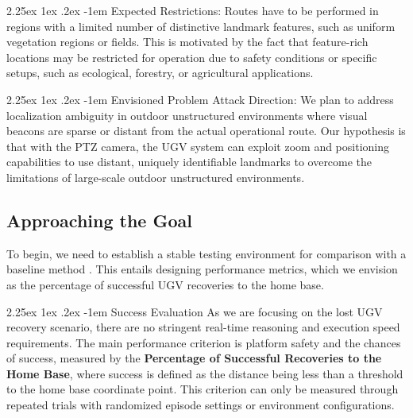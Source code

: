 \documentclass[runningheads]{llncs}
\makeatletter
\renewcommand\paragraph{\@startsection{paragraph}{4}{\z@}%
                                    {2.25ex \@plus1ex \@minus.2ex}%
                                    {-1em}%
                                    {\normalfont\normalsize\bfseries}}
\makeatother
\begin{document}
\paragraph{Expected Restrictions}:
Routes have to be performed in regions with a limited number of distinctive landmark features, such as uniform vegetation regions or fields. This is motivated by the fact that feature-rich locations may be restricted for operation due to safety conditions or specific setups, such as ecological, forestry, or agricultural applications.

\paragraph{Envisioned Problem Attack Direction}:
We plan to address localization ambiguity in outdoor unstructured environments where visual beacons are sparse or distant from the actual operational route. Our hypothesis is that with the PTZ camera, the UGV system can exploit zoom and positioning capabilities to use distant, uniquely identifiable landmarks to overcome the limitations of large-scale outdoor unstructured environments.

\subsection{Approaching the Goal}

To begin, we need to establish a stable testing environment for comparison with a baseline method \cite{VisualTeachAndRepeat}. This entails designing performance metrics, which we envision as the percentage of successful UGV recoveries to the home base.

\paragraph{Success Evaluation}
As we are focusing on the lost UGV recovery scenario, there are no stringent real-time reasoning and execution speed requirements. The main performance criterion is platform safety and the chances of success, measured by the \textbf{Percentage of Successful Recoveries to the Home Base}, where success is defined as the distance being less than a threshold to the home base coordinate point. This criterion can only be measured through repeated trials with randomized episode settings or environment configurations.
\end{document}
